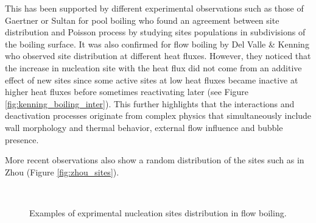 \npar
This has been supported by different experimental observations such as those of Gaertner \cite{gaertner_population_1960} or Sultan \cite{sultan_spatial_1978} for pool boiling who found an agreement between site distribution and Poisson process by studying sites populations in subdivisions of the boiling surface. It was also confirmed for flow boiling by Del Valle \& Kenning \cite{kenning_boiling} who observed site distribution at different heat fluxes. However, they noticed that the increase in nucleation site with the heat flux did not come from an additive effect of new sites since some active sites at low heat fluxes became inactive at higher heat fluxes before sometimes reactivating later (see Figure \ref{fig:kenning_boiling_inter}). This further highlights that the interactions and deactivation processes originate from complex physics that simultaneously include wall morphology and thermal behavior, external flow influence and bubble presence. 

\npar

More recent observations also show a random distribution of the sites such as in Zhou \etal \cite{zhou_experimental_2020-1} (Figure \ref{fig:zhou_sites}).

\begin{figure}[!h]
\centering

\\

\caption{Examples of exprimental nucleation sites distribution in flow boiling.}
\label{fig:sites_distribution}
\end{figure}

